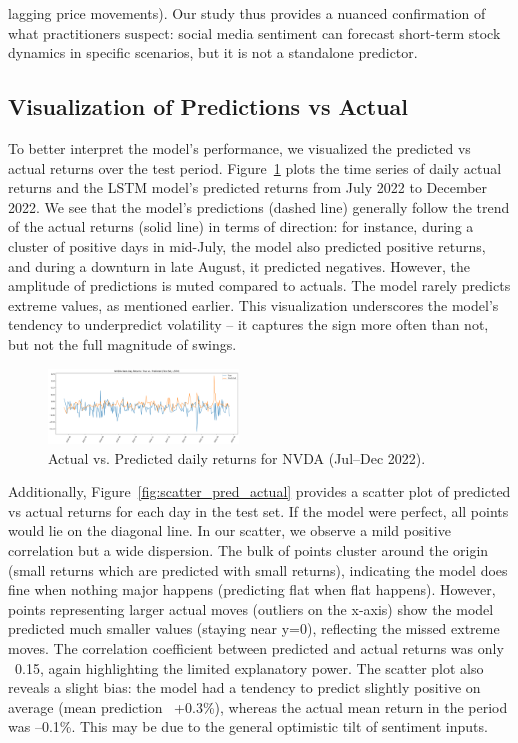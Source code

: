 \documentclass[conference]{IEEEtran}
\begin{document}
lagging price movements). Our study thus provides a nuanced confirmation of what practitioners suspect: social media sentiment can forecast short-term stock dynamics in specific scenarios, but it is not a standalone predictor.

\subsection{Visualization of Predictions vs Actual}
To better interpret the model’s performance, we visualized the predicted vs actual returns over the test period. Figure~\ref{fig:pred_vs_actual} plots the time series of daily actual returns and the LSTM model’s predicted returns from July 2022 to December 2022. We see that the model’s predictions (dashed line) generally follow the trend of the actual returns (solid line) in terms of direction: for instance, during a cluster of positive days in mid-July, the model also predicted positive returns, and during a downturn in late August, it predicted negatives. However, the amplitude of predictions is muted compared to actuals. The model rarely predicts extreme values, as mentioned earlier. This visualization underscores the model’s tendency to underpredict volatility -- it captures the sign more often than not, but not the full magnitude of swings.

\begin{figure}[ht]
	\centering
	\includegraphics[width=0.45\textwidth]{pred_vs_actual_returns.png}
	\caption{Actual vs. Predicted daily returns for NVDA (Jul--Dec 2022).}
	\label{fig:pred_vs_actual}
\end{figure}

Additionally, Figure~\ref{fig:scatter_pred_actual} provides a scatter plot of predicted vs actual returns for each day in the test set. If the model were perfect, all points would lie on the diagonal line. In our scatter, we observe a mild positive correlation but a wide dispersion. The bulk of points cluster around the origin (small returns which are predicted with small returns), indicating the model does fine when nothing major happens (predicting flat when flat happens). However, points representing larger actual moves (outliers on the x-axis) show the model predicted much smaller values (staying near y=0), reflecting the missed extreme moves. The correlation coefficient between predicted and actual returns was only ~0.15, again highlighting the limited explanatory power. The scatter plot also reveals a slight bias: the model had a tendency to predict slightly positive on average (mean prediction ~+0.3\%), whereas the actual mean return in the period was --0.1\%. This may be due to the general optimistic tilt of sentiment inputs.
\end{document}
